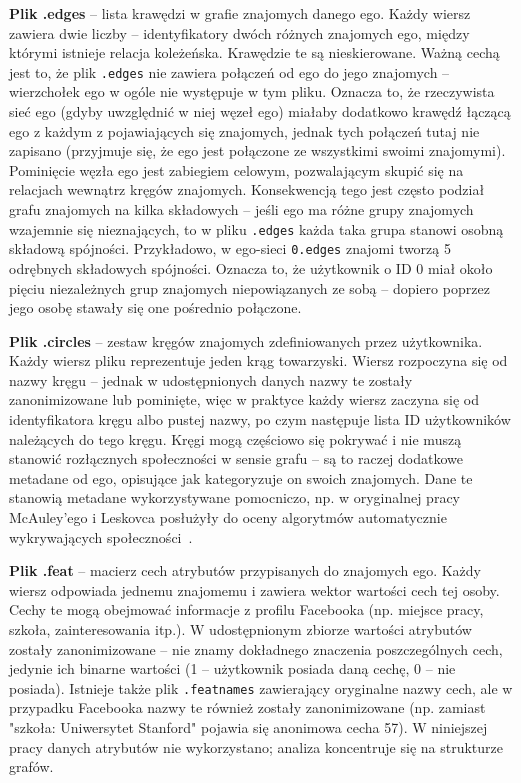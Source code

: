 \textbf{Plik .edges} -- lista krawędzi w grafie znajomych danego ego. Każdy wiersz zawiera dwie liczby -- identyfikatory dwóch różnych znajomych ego, między którymi istnieje relacja koleżeńska. Krawędzie te są nieskierowane. Ważną cechą jest to, że plik \verb|.edges| nie zawiera połączeń od ego do jego znajomych -- wierzchołek ego w ogóle nie występuje w tym pliku. Oznacza to, że rzeczywista sieć ego (gdyby uwzględnić w niej węzeł ego) miałaby dodatkowo krawędź łączącą ego z każdym z pojawiających się znajomych, jednak tych połączeń tutaj nie zapisano (przyjmuje się, że ego jest połączone ze wszystkimi swoimi znajomymi). Pominięcie węzła ego jest zabiegiem celowym, pozwalającym skupić się na relacjach wewnątrz kręgów znajomych. Konsekwencją tego jest często podział grafu znajomych na kilka składowych -- jeśli ego ma różne grupy znajomych wzajemnie się nieznających, to w pliku \verb|.edges| każda taka grupa stanowi osobną składową spójności. Przykładowo, w ego-sieci \verb|0.edges| znajomi tworzą 5 odrębnych składowych spójności. Oznacza to, że użytkownik o ID 0 miał około pięciu niezależnych grup znajomych niepowiązanych ze sobą -- dopiero poprzez jego osobę stawały się one pośrednio połączone.

\textbf{Plik .circles} -- zestaw kręgów znajomych zdefiniowanych przez użytkownika. Każdy wiersz pliku reprezentuje jeden krąg towarzyski. Wiersz rozpoczyna się od nazwy kręgu -- jednak w udostępnionych danych nazwy te zostały zanonimizowane lub pominięte, więc w praktyce każdy wiersz zaczyna się od identyfikatora kręgu albo pustej nazwy, po czym następuje lista ID użytkowników należących do tego kręgu. Kręgi mogą częściowo się pokrywać i nie muszą stanowić rozłącznych społeczności w sensie grafu -- są to raczej dodatkowe metadane od ego, opisujące jak kategoryzuje on swoich znajomych. Dane te stanowią metadane wykorzystywane pomocniczo, np. w oryginalnej pracy McAuley'ego i Leskovca posłużyły do oceny algorytmów automatycznie wykrywających społeczności~\cite{McAuley2012}.

\textbf{Plik .feat} -- macierz cech atrybutów przypisanych do znajomych ego. Każdy wiersz odpowiada jednemu znajomemu i zawiera wektor wartości cech tej osoby. Cechy te mogą obejmować informacje z profilu Facebooka (np. miejsce pracy, szkoła, zainteresowania itp.). W udostępnionym zbiorze wartości atrybutów zostały zanonimizowane -- nie znamy dokładnego znaczenia poszczególnych cech, jedynie ich binarne wartości (1 -- użytkownik posiada daną cechę, 0 -- nie posiada). Istnieje także plik \verb|.featnames| zawierający oryginalne nazwy cech, ale w przypadku Facebooka nazwy te również zostały zanonimizowane (np. zamiast "szkoła: Uniwersytet Stanford" pojawia się anonimowa cecha 57). W niniejszej pracy danych atrybutów nie wykorzystano; analiza koncentruje się na strukturze grafów.


